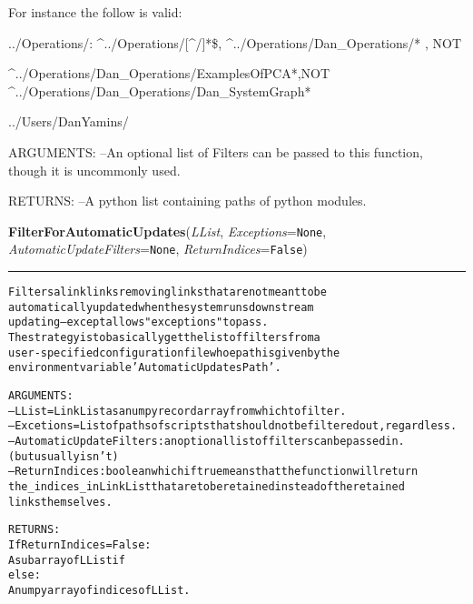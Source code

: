 \begin{boxedminipage}{\funcwidth}
    For instance the follow is valid:

    ../Operations/: 
    {\textasciicircum}../Operations/[{\textasciicircum}/]*\$, 
    {\textasciicircum}../Operations/Dan\_Operations/* , NOT

    {\textasciicircum}../Operations/Dan\_Operations/ExamplesOfPCA*,NOT 
    {\textasciicircum}../Operations/Dan\_Operations/Dan\_SystemGraph*

    ../Users/DanYamins/

    ARGUMENTS: --An optional list of Filters can be passed to this 
    function, though it is uncommonly used.

    RETURNS: --A python list containing paths of python modules.

\setlength{\parskip}{1ex}
    \end{boxedminipage}

    \label{System:LinkManagement:FilterForAutomaticUpdates}

    \vspace{0.5ex}

\hspace{.8\funcindent}\begin{boxedminipage}{\funcwidth}

    \raggedright \textbf{FilterForAutomaticUpdates}(\textit{LList}, \textit{Exceptions}={\tt None}, \textit{AutomaticUpdateFilters}={\tt None}, \textit{ReturnIndices}={\tt False})

    \vspace{-1.5ex}

    \rule{\textwidth}{0.5\fboxrule}
\setlength{\parskip}{2ex}
\begin{alltt}

Filters a link links removing links that are not meant to be 
automatically updated when the system runs downstream 
updating -- except allows "exceptions" to pass. 
The strategy is to basically get the list of filters from a 
user-specified configuration file whoe path is given by the 
environment variable 'AutomaticUpdatesPath'.

ARGUMENTS:
--LList = LinkList as a numpy record array from which to filter. 
--Excetions = List of paths of scripts that should not be filtered out, regardless. 
--AutomaticUpdateFilters  : an optional list of filters can be passed in.  (but usually isn't)
--ReturnIndices:  boolean which if true means that the function will return 
the \_indices\_ in LinkList that are to be retained instead of the retained
links themselves. 
        
RETURNS:
If ReturnIndices = False:
        A subarray of LList if 
else:
        A numpy array of indices of LList. 
        
\end{alltt}

\setlength{\parskip}{1ex}
    \end{boxedminipage}


